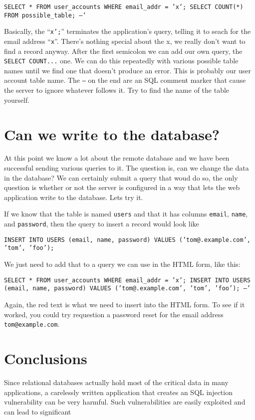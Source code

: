 \documentclass{article}
\begin{document}
\texttt{SELECT * FROM user\_accounts WHERE email\_addr = '{\color{red}x'; SELECT COUNT(*) FROM possible\_table; --}' }

Basically, the ``\texttt{x';}'' terminates the application's query, telling it to seach for the email address ``\texttt{x}''. There's nothing special about the x, we really don't want to find a record anyway. After the first semicolon we can add our own query, the \texttt{SELECT COUNT...} one. We can do this repeatedly with various possible table names until we find one that doesn't produce an error. This is probably our user account table name. The \texttt{--} on the end are an SQL comment marker that cause the server to ignore whatever follows it. Try to find the name of the table yourself.

\section{Can we write to the database?}
At this point we know a lot about the remote database and we have been successful sending various queries to it. The question is, can we change the data in the database? We can certainly submit a query that woud do so, the only question is whether or not the server is configured in a way that lets the web application write to the database. Lets try it.

If we know that the table is named \texttt{users} and that it has columns \texttt{email}, \texttt{name}, and \texttt{password}, then the query to insert a record would look like 

\texttt{INSERT INTO USERS (email, name, password) VALUES ('tom@.example.com', 'tom', 'foo');}

We just need to add that to a query we can use in the HTML form, like this:

\texttt{SELECT * FROM user\_accounts WHERE email\_addr = '{\color{red}x'; INSERT INTO USERS (email, name, password) VALUES ('tom@.example.com', 'tom', 'foo'); --}' }

Again, the red text is what we need to insert into the HTML form. To see if it worked, you could try requestion a password reset for the email address \texttt{tom@example.com}.

\section{Conclusions}
Since relational databases actually hold most of the critical data in many applications, a carelessly written application that creates an SQL injection vulnerability can be very harmful. Such vulnerabilities are easily exploited and can lead to significant 
\end{document}
